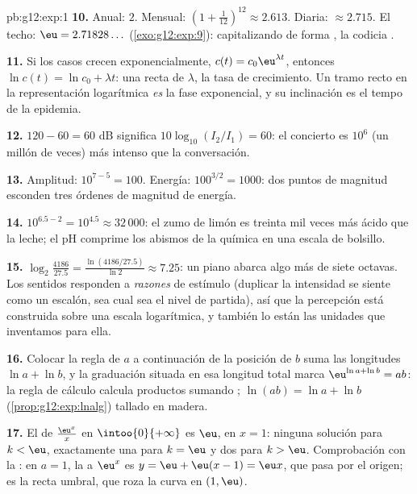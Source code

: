 \begin{solution}{pb:g12:exp:1}
\textbf{10.} Anual: $2$. Mensual:
$\left(1 + \frac{1}{12}\right)^{12} \approx 2.613$. Diaria:
$\approx 2.715$. El techo: $\eu = 2.71828\ldots$ (\cref{exo:g12:exp:9}):
capitalizando de forma , la codicia .

\textbf{11.} Si los casos crecen exponencialmente,
$c(t) = c_0 \eu^{\lambda t}$, entonces
$\ln c(t) = \ln c_0 + \lambda t$: una recta de  $\lambda$, la tasa
de crecimiento. Un tramo recto en la representación logarítmica \emph{es}
la fase exponencial, y su inclinación es el tempo de la epidemia.

\textbf{12.} $120 - 60 = 60$ dB significa
$10\log_{10}(I_2/I_1) = 60$: el concierto es $10^6$ (un millón de veces)
más intenso que la conversación.

\textbf{13.} Amplitud: $10^{7-5} = 100$. Energía: $100^{3/2} = 1000$: dos
puntos de magnitud esconden tres órdenes de magnitud de energía.

\textbf{14.} $10^{6.5 - 2} = 10^{4.5} \approx 32\,000$: el zumo de limón es
treinta mil veces más ácido que la leche; el pH comprime los abismos de la
química en una escala de bolsillo.

\textbf{15.} $\log_2\!\frac{4186}{27.5} = \frac{\ln(4186/27.5)}{\ln 2}
\approx 7.25$: un piano abarca algo más de siete octavas. Los sentidos
responden a \emph{razones} de estímulo (duplicar la intensidad se siente
como un escalón, sea cual sea el nivel de partida), así que la percepción
está construida sobre una escala logarítmica, y también lo están las
unidades que inventamos para ella.

\textbf{16.} Colocar la regla de $a$ a continuación de la posición de $b$
suma las longitudes $\ln a + \ln b$, y la graduación situada en esa
longitud total marca $\eu^{\ln a + \ln b} = ab$: la regla de cálculo
calcula productos sumando ;
$\ln(ab) = \ln a + \ln b$ (\cref{prop:g12:exp:lnalg}) tallado en madera.

\textbf{17.} El  de $\frac{\eu^x}{x}$ en $\intoo{0}{+\infty}$ es
$\eu$, en $x = 1$: ninguna solución para $k < \eu$, exactamente una para
$k = \eu$ y dos para $k > \eu$. Comprobación con la : en $a = 1$,
la  a $\eu^x$ es $y = \eu + \eu(x - 1) = \eu x$, que pasa por el
origen; es la recta umbral, que roza la curva en $(1, \eu)$.


\end{solution}
